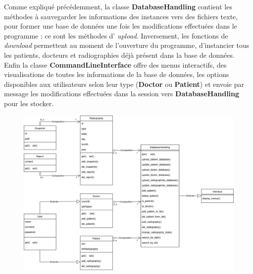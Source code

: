 \documentclass[12pt,a4paper]{article}
\begin{document}
\begin{multicols}{2}
		Comme expliqué précédemment, la classe \textbf{DatabaseHandling} contient les méthodes à sauvegarder les informations des instances vers des fichiers texte, pour former une base de données une fois les modifications effectuées dans le programme : ce sont les méthodes d' \og \textit{upload}\fg{}. Inversement, les fonctions de \og \textit{download}\fg{} permettent au moment de l'ouverture du programme, d'instancier tous les patients, docteurs et radiographies déjà présent dans la base de données. \\
		
		Enfin la classe \textbf{CommandLineInterface} offre des menus interactifs, des visualisations de toutes les informations de la base de données, les options disponibles aux utilisateurs selon leur type (\textbf{Doctor} ou \textbf{Patient}) et envoie par \og message\fg{} les modifications effectuées dans la \og session\fg{} vers \textbf{DatabaseHandling} pour les stocker. \\
		
	\end{multicols}

	\begin{figure}[H]
		\centering
		\includegraphics[width=0.8\linewidth]{images/UML_OOP.png}
		\label{fig:UML}
	\end{figure}

	\pagebreak


\end{document}
